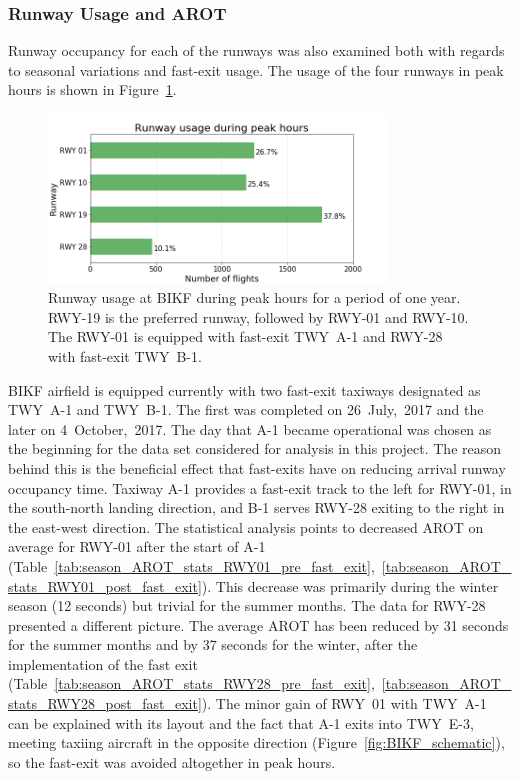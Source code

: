 \subsubsection{Runway Usage and AROT\label{sssec:runway_usage_arot}}
Runway occupancy for each of the runways was also examined both with regards to seasonal variations and fast-exit usage. The usage of the four runways in peak hours is shown in Figure~\ref{fig:runway_usage_peak}. 
\begin{figure}[h]
    \centering
    \includegraphics[width=0.8\textwidth]{graphics/fig_runway_usage_peak.png}
    \caption[Runway usage at BIKF during peak hours]{Runway usage at BIKF during peak hours for a period of one year. RWY-19 is the preferred runway, followed by RWY-01 and RWY-10. The RWY-01 is equipped with fast-exit TWY~A-1 and RWY-28 with fast-exit TWY~B-1.}
    \label{fig:runway_usage_peak}
\end{figure}
BIKF airfield is equipped currently with two fast-exit taxiways designated as TWY~A-1 and TWY~B-1. The first was completed on 26~July,~2017 and the later on 4~October,~2017. The day that A-1 became operational was chosen as the beginning for the data set considered for analysis in this project. The reason behind this is the beneficial effect that fast-exits have on reducing arrival runway occupancy time. Taxiway A-1 provides a fast-exit track to the left for RWY-01, in the south-north landing direction, and B-1 serves RWY-28 exiting to the right in the east-west direction. The statistical analysis points to decreased AROT on average for RWY-01 after the start of A-1 (Table~\ref{tab:season_AROT_stats_RWY01_pre_fast_exit},~\ref{tab:season_AROT_stats_RWY01_post_fast_exit}). This decrease was primarily during the winter season (12 seconds) but trivial for the summer months. The data for RWY-28 presented a different picture. The average AROT has been reduced by 31 seconds for the summer months and by 37 seconds for the winter, after the implementation of the fast exit (Table~\ref{tab:season_AROT_stats_RWY28_pre_fast_exit},~\ref{tab:season_AROT_stats_RWY28_post_fast_exit}). The minor gain of RWY~01 with TWY~A-1 can be explained with its layout and the fact that A-1 exits into TWY~E-3, meeting taxiing aircraft in the opposite direction (Figure~\ref{fig:BIKF_schematic}), so the fast-exit was avoided altogether in peak hours.\\
